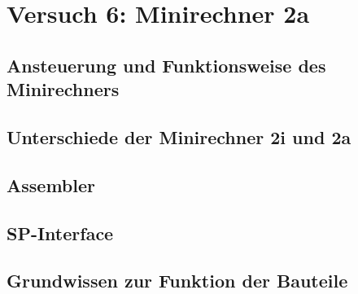 \documentclass[paper=a4, fontsize=11pt]{scrartcl}
\numberwithin{equation}{section}
\numberwithin{figure}{section}
\numberwithin{table}{section}
\begin{document}
\newpage

\section{Versuch 6: Minirechner 2a}


\subsection{Ansteuerung und Funktionsweise des Minirechners}


\subsection{Unterschiede der Minirechner 2i und 2a}


\subsection{Assembler}


\subsection{SP-Interface}


\subsection{Grundwissen zur Funktion der Bauteile}

\end{document}
